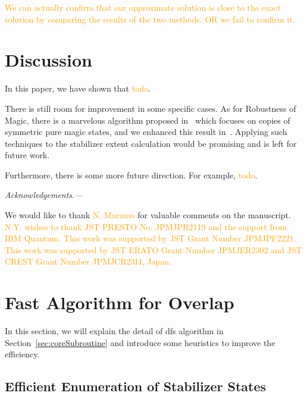 \documentclass[a4paper, onecolumn, 11pt, longbibliography]{quantumarticle}
\newcommand{\orange}[1]{\textcolor{orange}{#1}}
\begin{document}
\orange{We can actually confirm that
  our approximate solution is close to the exact solution
  by comparing the results of the two methods.
  OR we fail to confirm it.}

\section{Discussion}

In this paper, we have shown that \orange{todo}.

There is still room for improvement
in some specific cases.
As for Robustness of Magic,
there is a marvelous algorithm
proposed in~\cite{Heinrich2019robustnessofmagic}
which focuses on copies of symmetric pure magic states,
and we enhanced this result in~\cite{hamaguchiHandbookEfficientlyQuantifying2023}.
Applying such techniques to the stabilizer extent calculation
would be promising and is left for future work.

Furthermore, there is some more future direction.
For example, \orange{todo}.

\emph{Acknowledgements.---}

We would like to thank \orange{N. Marumo} for valuable comments on the manuscript.
\orange{N.Y. wishes to thank JST PRESTO No. JPMJPR2119 and the support
  from IBM Quantum. This work was supported by JST Grant Number JPMJPF2221.
  This work was supported by JST ERATO Grant Number JPMJER2302 and JST CREST
  Grant Number JPMJCR23I4, Japan.}




\appendix

\section{Fast Algorithm for Overlap}

In this section, we will explain the detail of
dfs algorithm in Section~\ref{sec:coreSubroutine}
and introduce some heuristics to improve the efficiency.

\subsection{Efficient Enumeration of Stabilizer States}
\label{sec:efficientEnumeration}
\end{document}

